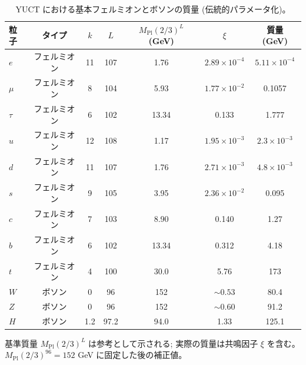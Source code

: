 \documentclass[11pt,a4paper]{article}
\theoremstyle{remark}
\begin{document}
	\vspace{2.0cm}
	
	\begin{table}[H]
		\centering
		\caption{YUCT における基本フェルミオンとボソンの質量 (伝統的パラメータ化)。}
		\label{tab:fermions}
		\normalsize
		\begin{tabular}{l c c c c c c}
			\toprule
			粒子 & タイプ & \(k\) & \(L\) & \(M_{\mathrm{Pl}}(2/3)^L\) (GeV) & \(\xi\) & 質量 (GeV) \\
			\midrule
			\(e\) & フェルミオン & 11 & 107 & 1.76 & \(2.89\times10^{-4}\) & \(5.11\times10^{-4}\) \\
			\(\mu\) & フェルミオン & 8  & 104 & 5.93 & \(1.77\times10^{-2}\) & 0.1057 \\
			\(\tau\) & フェルミオン & 6  & 102 & 13.34 & 0.133 & 1.777 \\
			\(u\) & フェルミオン & 12 & 108 & 1.17 & \(1.95\times10^{-3}\) & \(2.3\times10^{-3}\) \\
			\(d\) & フェルミオン & 11 & 107 & 1.76 & \(2.71\times10^{-3}\) & \(4.8\times10^{-3}\) \\
			\(s\) & フェルミオン & 9  & 105 & 3.95 & \(2.36\times10^{-2}\) & 0.095 \\
			\(c\) & フェルミオン & 7  & 103 & 8.90 & 0.140 & 1.27 \\
			\(b\) & フェルミオン & 6  & 102 & 13.34 & 0.312 & 4.18 \\
			\(t\) & フェルミオン & 4  & 100 & 30.0 & 5.76 & 173 \\
			\midrule
			\(W\) & ボソン & 0 & 96 & 152 & \(\sim0.53\) & 80.4 \\
			\(Z\) & ボソン & 0 & 96 & 152 & \(\sim0.60\) & 91.2 \\
			\(H\) & ボソン & 1.2 & 97.2 & 94.0 & 1.33 & 125.1 \\
			\bottomrule
		\end{tabular}
		\par\smallskip
		\footnotesize 基準質量 \(M_{\mathrm{Pl}}(2/3)^L\) は参考として示される; 実際の質量は共鳴因子 \(\xi\) を含む。\(M_{\mathrm{Pl}}(2/3)^{96}=152\) GeV に固定した後の補正値。
	\end{table}
	
\end{document}
